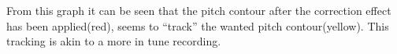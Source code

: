 \documentclass[a1paper,portrait,fontscale=0.43]{baposter}
\begin{document}
\begin{poster}
{\vspace{2mm}
\setlength{\fboxsep}{0pt}
\vspace{2mm}

From this graph it can be seen that the pitch contour after the correction effect
has been applied(red), seems to ``track'' the wanted pitch contour(yellow). This
tracking is akin to a more in tune recording.

}

\end{poster}
\end{document}
